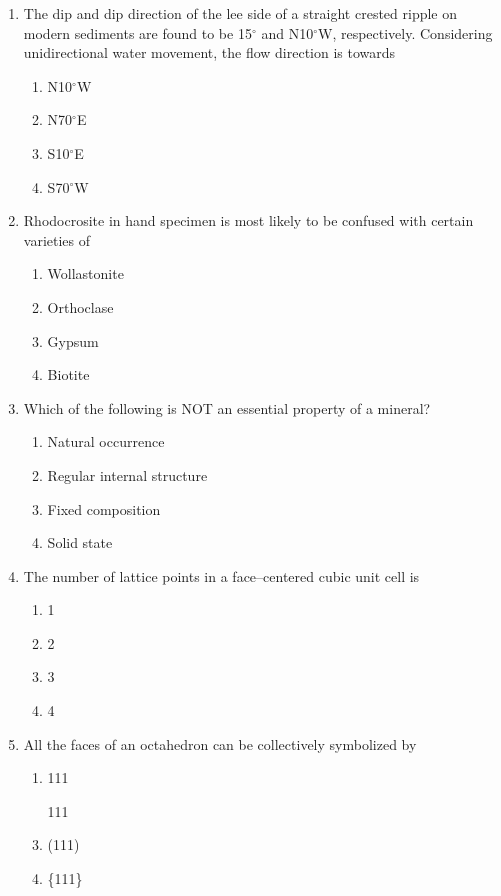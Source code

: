 \documentclass[journal,12pt,onecolumn]{IEEEtran}
\theoremstyle{remark}
\begin{document}
\begin{enumerate}
\item The dip and dip direction of the lee side of a straight crested ripple on modern sediments are found to be 15$^\circ$ and N10$^\circ$W, respectively. Considering unidirectional water movement, the flow direction is towards
\begin{enumerate}
\item N10$^\circ$W
\item N70$^\circ$E
\item S10$^\circ$E
\item S70$^\circ$W
\end{enumerate}
\vspace{0.5cm}

\item Rhodocrosite in hand specimen is most likely to be confused with certain varieties of
\begin{enumerate}
\item Wollastonite
\item Orthoclase
\item Gypsum
\item Biotite
\end{enumerate}
\vspace{0.5cm}

\item Which of the following is NOT an essential property of a mineral?
\begin{enumerate}
\item Natural occurrence
\item Regular internal structure
\item Fixed composition
\item Solid state
\end{enumerate}
\vspace{0.5cm}


\item The number of lattice points in a face--centered cubic unit cell is
\begin{enumerate}
\item 1
\item 2
\item 3
\item 4
\end{enumerate}
\vspace{0.5cm}

\item All the faces of an octahedron can be collectively symbolized by
\begin{enumerate}
\item 111
\item [111]
\item (111)
\item \{111\}
\end{enumerate}
\vspace{0.5cm}


\end{enumerate}
\end{document}
